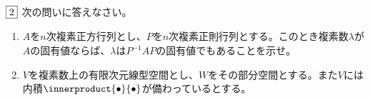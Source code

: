 \begin{tcolorbox} %
	$\fbox{2}$ 次の問いに答えなさい。
\begin{enumerate}
	\item $A$を$n$次複素正方行列とし、$P$を$n$次複素正則行列とする。このとき複素数$\lambda$が$A$の固有値ならば、$\lambda$は$P^{-1}AP$の固有値でもあることを示せ。
	\item $V$を複素数上の有限次元線型空間とし、$W$をその部分空間とする。また$V$には内積$\innerproduct{\bullet}{\bullet}$が備わっているとする。
\end{enumerate}
\end{tcolorbox}

